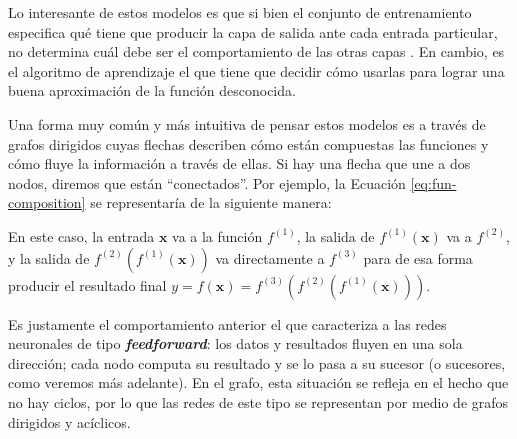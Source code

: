 \documentclass[../../main.tex]{subfiles}
\begin{document}
Lo interesante de estos modelos es que si bien el conjunto de entrenamiento especifica qué
tiene que producir la capa de salida ante cada entrada particular, no determina cuál debe
ser el comportamiento de las otras capas \cite{deep-learning}. En cambio, es el algoritmo
de aprendizaje el que tiene que decidir cómo usarlas para lograr una buena aproximación de
la función desconocida.

Una forma muy común y más intuitiva de pensar estos modelos es a través de grafos
dirigidos cuyas flechas describen cómo están compuestas las funciones y cómo fluye la
información a través de ellas. Si hay una flecha que une a dos nodos, diremos que están
``conectados''. Por ejemplo, la Ecuación \ref{eq:fun-composition} se representaría de la
siguiente manera:
\begin{center}
\end{center}

En este caso, la entrada \(\mathbf{x}\) va a la función \(f^{(1)}\), la salida de
\(f^{(1)}(\mathbf{x})\) va a \(f^{(2)}\), y la salida de \(f^{(2)}(f^{(1)}(\mathbf{x}))\)
va directamente a \(f^{(3)}\) para de esa forma producir el resultado final \(y =
f(\mathbf{x}) = f^{(3)}(f^{(2)}(f^{(1)}(\mathbf{x})))\).

Es justamente el comportamiento anterior el que caracteriza a las redes neuronales de tipo
\textbf{\textit{feedforward}}: los datos y resultados fluyen en una sola dirección; cada
nodo computa su resultado y se lo pasa a su sucesor (o sucesores, como veremos más
adelante). En el grafo, esta situación se refleja en el hecho que no hay ciclos, por lo
que las redes de este tipo se representan por medio de grafos dirigidos y acíclicos.
\end{document}
